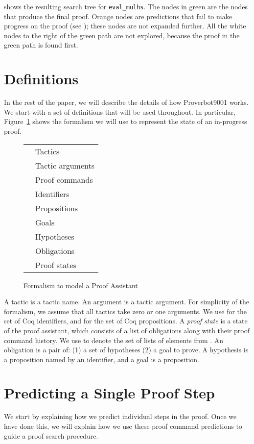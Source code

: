\documentclass[sigplan,screen]{acmart}
\newcommand{\name}{Proverbot9001\xspace}
\renewcommand{\>}{\quad}
\begin{document}
 shows the resulting search tree for \texttt{eval_mulhs}.
The nodes in green are the nodes that produce the final proof.
Orange nodes are predictions
  that fail to make progress on the proof (see );
  these nodes are not expanded further.
All the white nodes to the right of the green path are not explored,
  because the proof in the green path is found first.
 \section{Definitions}

In the rest of the paper, we will describe the details of how \name{} works.
We start with a set of definitions that will be used throughout.
In particular, Figure~\ref{fig:defns} shows the formalism we will use to represent the state of an in-progress proof.
\begin{figure}
\begin{tabular}{ll}
 & Tactics \\
 & Tactic arguments\\
 & Proof commands \\
 & Identifiers\\
 & Propositions \\
 & Goals \\
 & Hypotheses \\
 & Obligations \\
 & Proof states \\
\end{tabular}
\caption{Formalism to model a Proof Assistant}
\label{fig:defns}
\end{figure}
A tactic  is a tactic name.
An argument  is a tactic argument.
For simplicity of the formalism, we assume that all tactics take zero or one arguments.
We use  for the set of Coq identifiers, and  for the set of Coq propositions.
A \emph{proof state}  is a state of the proof assistant, which consists of a list of obligations along with their proof command history.
We use  to denote the set of lists of elements from .
An obligation is a pair of: (1) a set of hypotheses (2) a goal to prove.
A hypothesis is a proposition named by an identifier, and a goal is a proposition.

\section{Predicting a Single Proof Step}
\label{sec:prediction}

We start by explaining how we predict individual steps in the proof.
Once we have done this, we will explain how we use these proof command predictions to guide a proof search procedure.
\end{document}
